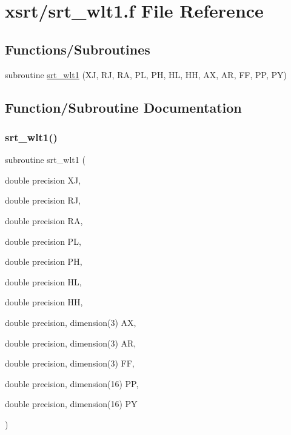 \hypertarget{srt__wlt1_8f}{}\section{xsrt/srt\+\_\+wlt1.f File Reference}
\label{srt__wlt1_8f}
\subsection*{Functions/\+Subroutines}
\begin{DoxyCompactItemize}
\item 
subroutine \hyperlink{srt__wlt1_8f_a03a9730eb398b9aa108a9870f61eaa7e}{srt\+\_\+wlt1} (XJ, RJ, RA, PL, PH, HL, HH, AX, AR, FF, PP, PY)
\end{DoxyCompactItemize}


\subsection{Function/\+Subroutine Documentation}
\mbox{\label{srt__wlt1_8f_a03a9730eb398b9aa108a9870f61eaa7e}} 
\subsubsection{\texorpdfstring{srt\+\_\+wlt1()}{srt\_wlt1()}}
{\footnotesize\ttfamily subroutine srt\+\_\+wlt1 (\begin{DoxyParamCaption}\item[{double precision}]{XJ,  }\item[{double precision}]{RJ,  }\item[{double precision}]{RA,  }\item[{double precision}]{PL,  }\item[{double precision}]{PH,  }\item[{double precision}]{HL,  }\item[{double precision}]{HH,  }\item[{double precision, dimension(3)}]{AX,  }\item[{double precision, dimension(3)}]{AR,  }\item[{double precision, dimension(3)}]{FF,  }\item[{double precision, dimension(16)}]{PP,  }\item[{double precision, dimension(16)}]{PY }\end{DoxyParamCaption})}

